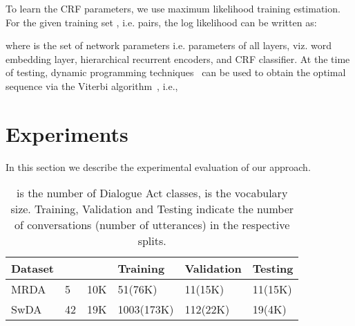 \documentclass[letterpaper]{article} \usepackage{aaai18}
\begin{document}
To learn the CRF parameters, we use maximum likelihood training estimation. For the given training set , i.e.  pairs, the log likelihood can be written as:

where  is the set of network parameters i.e. parameters of all layers, viz. word embedding layer, hierarchical recurrent encoders, and CRF classifier. At the time of testing, dynamic programming techniques~\cite{Rabiner1989} can be used to obtain the optimal sequence via the Viterbi algorithm~\cite{Viterbi1967}, i.e., 


 \section{Experiments}
\label{sec:exp}
In this section we describe the experimental evaluation of our approach.
\begin{table}[!htb]
  \small
  \begin{tabular}{|p{0.9cm}|p{0.3cm}|p{0.5cm}|l|l|l|}
    \hline
    Dataset &  &  & Training 	& Validation & Testing	\\\hline
    MRDA	& 5		& 10K	& 51(76K)	& 11(15K)	 & 11(15K) 	\\
    SwDA	& 42	& 19K	& 1003(173K)& 112(22K)	 & 19(4K) 	\\
    \hline
  \end{tabular}
  \caption{ is the number of Dialogue Act classes,  is the vocabulary size. Training, Validation and Testing indicate the number of conversations (number of utterances) in the respective splits.}
  \label{table:datastats}
\end{table}
\end{document}
